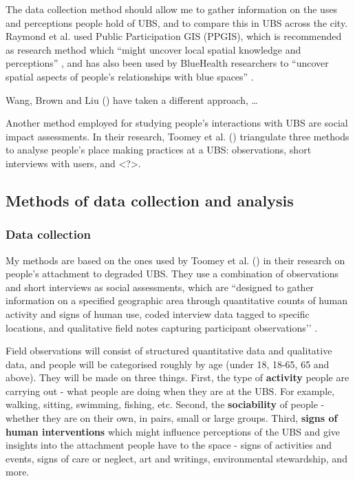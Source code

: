 \documentclass{article}
\begin{document}
The data collection method should allow me to gather information on the uses and perceptions people hold of UBS, and to compare this in UBS across the city. Raymond et al. used Public Participation GIS (PPGIS), which is recommended as research method which “might uncover local spatial knowledge and perceptions” \parencite{anguelovski2020expanding}, and has also been used by BlueHealth researchers to “uncover spatial aspects of people’s relationships with blue spaces” \parencite{bluehealthsoftgis}.

Wang, Brown and Liu (\citeyear{wang2015physical}) have taken a different approach, …

Another method employed for studying people’s interactions with UBS are social impact assessments. In their research, Toomey et al. (\citeyear{toomey2021place}) triangulate three methods to analyse people’s place making practices at a UBS: observations, short interviews with users, and <?>. 

\subsection{Methods of data collection and analysis}

\subsubsection{Data collection}

My methods are based on the ones used by Toomey et al. (\citeyear{toomey2021place}) in their research on people’s attachment to degraded UBS. They use a combination of observations and short interviews as social assessments, which are ``designed to gather information on a specified geographic area through quantitative counts of human activity and signs of human use, coded interview data tagged to specific locations, and qualitative field notes capturing participant observations’’ \parencite{toomey2021place}.

Field observations will consist of structured quantitative data and qualitative data, and people will be categorised roughly by age (under 18, 18-65, 65 and above). They will be made on three things. First, the type of \textbf{activity} people are carrying out - what people are doing when they are at the UBS. For example, walking, sitting, swimming, fishing, etc. Second, the \textbf{sociability} of people - whether they are on their own, in pairs, small or large groups. Third,  \textbf{signs of human interventions} which might influence perceptions of the UBS and give insights into the attachment people have to the space - signs of activities and events, signs of care or neglect, art and writings, environmental stewardship, and more.
\end{document}
